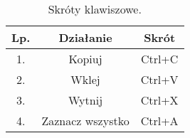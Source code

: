 \begin{table}[h!]
\centering
\begin{tabular}{||c c c||} 
 \hline
 Lp. & Działanie & Skrót  \\ [0.5ex] 
 \hline\hline
 1. & Kopiuj & Ctrl+C  \\ 
 2. & Wklej & Ctrl+V  \\
 3. & Wytnij & Ctrl+X  \\
 4. & Zaznacz wszystko & Ctrl+A  \\ [1ex] 
 \hline
\end{tabular}
\caption{Skróty klawiszowe.}
\label{table:1}
\end{table}